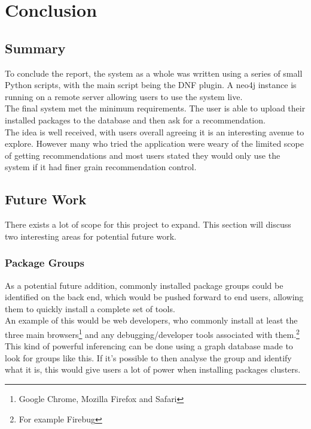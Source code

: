 \documentclass{l4proj}
\begin{document}
 
\chapter{Conclusion}

\section{Summary}
To conclude the report, the system as a whole was written using a series of small Python scripts, with the main script being the DNF plugin. A neo4j instance is running on a remote server allowing users to use the system live.\\
The final system met the minimum requirements. The user is able to upload their installed packages to the database and then ask for a recommendation.\\
The idea is well received, with users overall agreeing it is an interesting avenue to explore. However many who tried the application were weary of the limited scope of getting recommendations and most users stated they would only use the system if it had finer grain recommendation control.

\section{Future Work}
There exists a lot of scope for this project to expand. This section will discuss two interesting areas for potential future work.

\subsection{Package Groups}
As a potential future addition, commonly installed package groups could be identified on the back end, which would be pushed forward to end users, allowing them to quickly install a complete set of tools.\\
An example of this would be web developers, who commonly install at least the three main browsers\footnote{Google Chrome, Mozilla Firefox and Safari} and any debugging/developer tools associated with them.\footnote{For example Firebug}\\
This kind of powerful inferencing can be done using a graph database made to look for groups like this. If it's possible to then analyse the group and identify what it is, this would give users a lot of power when installing packages clusters.  
\end{document}
